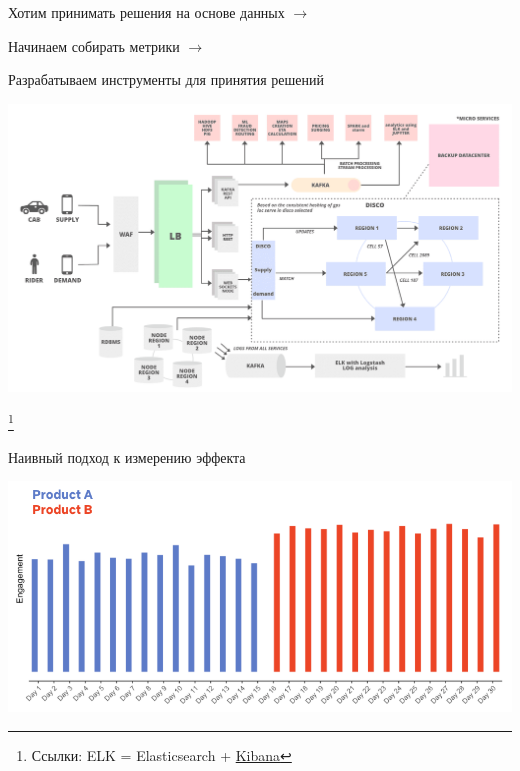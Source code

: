 \documentclass[11pt,aspectratio=169,handout]{beamer}
\begin{document}
\begin{frame}{}

Хотим принимать решения на основе данных $\rightarrow$ 

\qquad Начинаем собирать метрики $\rightarrow$ 

\qquad \qquad Разрабатываем инструменты для принятия решений

\begin{center}
\includegraphics[scale=0.18]{images/uber.png}
\end{center}

\footnote{Ссылки: ELK = Elasticsearch + \href{https://www.elastic.co/kibana/}{Kibana}}

\end{frame}

\begin{frame}{Наивный подход к измерению эффекта}
\begin{center}
\includegraphics[scale=0.3]{images/noexp.png}
\end{center}
\end{frame}
\end{document}
